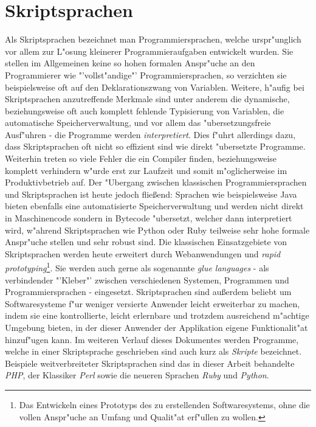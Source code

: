 \section{Skriptsprachen}
\label{sec:background:script}

Als Skriptsprachen bezeichnet man Programmiersprachen, welche urspr"unglich vor allem zur L"osung
kleinerer Programmieraufgaben entwickelt wurden. Sie stellen im Allgemeinen keine so hohen formalen 
Anspr"uche an den Programmierer wie "'vollst"andige"' Programmiersprachen, so verzichten sie
beispielsweise oft auf den Deklarationszwang von Variablen. Weitere, h"aufig bei
Skriptsprachen anzutreffende Merkmale sind unter anderem die dynamische, beziehungsweise oft auch komplett 
fehlende Typisierung von Variablen, die automatische Speicherverwaltung, und vor allem das
"ubersetzungsfreie Ausf"uhren - die Programme werden \emph{interpretiert}. Dies f"uhrt allerdings
dazu, dass Skriptsprachen oft nicht so effizient sind wie direkt "ubersetzte Programme. Weiterhin
treten so viele Fehler die ein Compiler finden, beziehungsweise komplett verhindern w"urde erst zur
Laufzeit und somit m"oglicherweise im Produktivbetrieb auf.
Der "Ubergang zwischen klassischen Programmiersprachen und Skriptsprachen ist heute jedoch flie\ss end: 
Sprachen wie beispielsweise Java bieten ebenfalls eine automatisierte Speicherverwaltung und werden nicht
direkt in Maschinencode sondern in Bytecode "ubersetzt, welcher dann interpretiert wird, w"ahrend 
Skriptsprachen wie Python oder Ruby teilweise sehr hohe formale Anspr"uche stellen und sehr robust sind.
Die klassischen Einsatzgebiete von Skriptsprachen werden heute erweitert durch Webanwendungen und
\emph{rapid prototyping}\footnote{
Das Entwickeln eines Prototyps des zu erstellenden Softwaresystems, ohne die vollen Anspr"uche an Umfang und
Qualit"at erf"ullen zu wollen.
}.
Sie werden auch gerne als sogenannte \emph{glue languages}
- als verbindender "'Kleber"' zwischen verschiedenen Systemen, Programmen und Programmiersprachen -
eingesetzt. Skriptsprachen sind au\ss erdem beliebt um Softwaresysteme f"ur weniger versierte Anwender
leicht erweiterbar zu machen, indem sie eine kontrollierte, leicht erlernbare und trotzdem 
ausreichend m"achtige Umgebung bieten, in der dieser Anwender der Applikation eigene Funktionalit"at 
hinzuf"ugen kann.
Im weiteren Verlauf dieses Dokumentes werden Programme, welche in einer Skriptsprache geschrieben sind 
auch kurz als \emph{Skripte} bezeichnet. Beispiele weitverbreiteter Skriptsprachen sind das in dieser
Arbeit behandelte \emph{PHP}, der Klassiker \emph{Perl} sowie die neueren Sprachen \emph{Ruby} und \emph{Python}.

